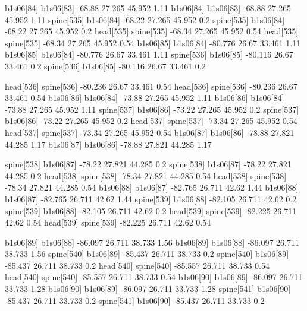 b1s06[84]    b1s06[83]    -68.88    27.265    45.952    1.11
b1s06[84]    b1s06[83]    -68.88    27.265    45.952    1.11
spine[535]    b1s06[84]    -68.22    27.265    45.952    0.2
spine[535]    b1s06[84]    -68.22    27.265    45.952    0.2
head[535]    spine[535]    -68.34    27.265    45.952    0.54
head[535]    spine[535]    -68.34    27.265    45.952    0.54
b1s06[85]    b1s06[84]    -80.776    26.67    33.461    1.11
b1s06[85]    b1s06[84]    -80.776    26.67    33.461    1.11
spine[536]    b1s06[85]    -80.116    26.67    33.461    0.2
spine[536]    b1s06[85]    -80.116    26.67    33.461    0.2


head[536]    spine[536]    -80.236    26.67    33.461    0.54
head[536]    spine[536]    -80.236    26.67    33.461    0.54
b1s06[86]    b1s06[84]    -73.88    27.265    45.952    1.11
b1s06[86]    b1s06[84]    -73.88    27.265    45.952    1.11
spine[537]    b1s06[86]    -73.22    27.265    45.952    0.2
spine[537]    b1s06[86]    -73.22    27.265    45.952    0.2
head[537]    spine[537]    -73.34    27.265    45.952    0.54
head[537]    spine[537]    -73.34    27.265    45.952    0.54
b1s06[87]    b1s06[86]    -78.88    27.821    44.285    1.17
b1s06[87]    b1s06[86]    -78.88    27.821    44.285    1.17


spine[538]    b1s06[87]    -78.22    27.821    44.285    0.2
spine[538]    b1s06[87]    -78.22    27.821    44.285    0.2
head[538]    spine[538]    -78.34    27.821    44.285    0.54
head[538]    spine[538]    -78.34    27.821    44.285    0.54
b1s06[88]    b1s06[87]    -82.765    26.711    42.62    1.44
b1s06[88]    b1s06[87]    -82.765    26.711    42.62    1.44
spine[539]    b1s06[88]    -82.105    26.711    42.62    0.2
spine[539]    b1s06[88]    -82.105    26.711    42.62    0.2
head[539]    spine[539]    -82.225    26.711    42.62    0.54
head[539]    spine[539]    -82.225    26.711    42.62    0.54


b1s06[89]    b1s06[88]    -86.097    26.711    38.733    1.56
b1s06[89]    b1s06[88]    -86.097    26.711    38.733    1.56
spine[540]    b1s06[89]    -85.437    26.711    38.733    0.2
spine[540]    b1s06[89]    -85.437    26.711    38.733    0.2
head[540]    spine[540]    -85.557    26.711    38.733    0.54
head[540]    spine[540]    -85.557    26.711    38.733    0.54
b1s06[90]    b1s06[89]    -86.097    26.711    33.733    1.28
b1s06[90]    b1s06[89]    -86.097    26.711    33.733    1.28
spine[541]    b1s06[90]    -85.437    26.711    33.733    0.2
spine[541]    b1s06[90]    -85.437    26.711    33.733    0.2


